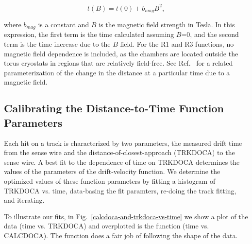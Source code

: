 \begin{equation} 
\label{eq-bmax}
t(B) = t(0) + b_{mag} B^2,
\end{equation}

\noindent
where $b_{mag}$ is a constant and $B$ is the magnetic field strength in Tesla. In this expression, the
first term is the time calculated assuming $B$=0, and the second term is the time increase due to the $B$
field. For the R1 and R3 functions, no magnetic field dependence is included, as the chambers are located
outside the torus cryostats in regions that are relatively field-free. See Ref.~\cite{qin96} for a related
parameterization of the change in the distance at a particular time due to a magnetic field. 

\subsection{Calibrating the Distance-to-Time Function Parameters}

Each hit on a track is characterized by two parameters, the measured drift 
time from the sense wire and the distance-of-closest-approach (TRKDOCA) to the 
sense wire.  A best fit to the dependence of time on TRKDOCA determines the
values of the parameters of the drift-velocity function. 
We determine the optimized values of these function parameters by fitting
a histogram of TRKDOCA vs. time, data-basing the fit paramters, re-doing
the track fitting, and iterating.

To illustrate our fits, in Fig.~\ref{calcdoca-and-trkdoca-vs-time} we show a plot of
the data (time vs. TRKDOCA) and overplotted is the function (time vs. CALCDOCA).
The function does a fair job of following the shape of the data.


